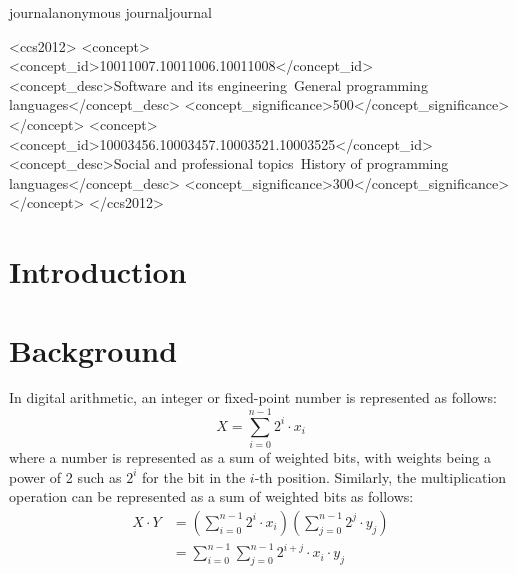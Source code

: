 \documentclass[review, anonymous, acmsmall]{acmart}
\def\acmversionanonymous{anonymous}
\def\acmversionjournal{journal}
\def\acmversion{anonymous}
\def\acmversion{journal}
\begin{document}
\ifx\acmversion\acmversionanonymous
{} %
\renewcommand\footnotetextcopyrightpermission[1]{} %
\fi
\ifx\acmversion\acmversionjournal
\begin{CCSXML}
<ccs2012>
<concept>
<concept_id>10011007.10011006.10011008</concept_id>
<concept_desc>Software and its engineering~General programming languages</concept_desc>
<concept_significance>500</concept_significance>
</concept>
<concept>
<concept_id>10003456.10003457.10003521.10003525</concept_id>
<concept_desc>Social and professional topics~History of programming languages</concept_desc>
<concept_significance>300</concept_significance>
</concept>
</ccs2012>
\end{CCSXML}


\fi

\maketitle

\section{Introduction}

\section{Background}
In digital arithmetic, an integer or fixed-point number is represented as follows:
\[
  X = \sum_{i=0}^{n-1} 2^i \cdot x_i 
\]
where a number is represented as a sum of weighted bits, with weights being a power of 2 such as $2^i$ for the bit in the $i$-th position. 
Similarly, the multiplication operation can be represented as a sum of weighted bits as follows:
\[
  \begin{aligned}
    X \cdot Y &= \left(\sum_{i=0}^{n-1} 2^i \cdot x_i\right)\left(\sum_{j=0}^{n-1} 2^j \cdot y_j\right) \\
              &= \sum_{i=0}^{n-1} \sum_{j=0}^{n-1} 2^{i+j} \cdot x_i \cdot y_j
  \end{aligned}
\]
\end{document}
